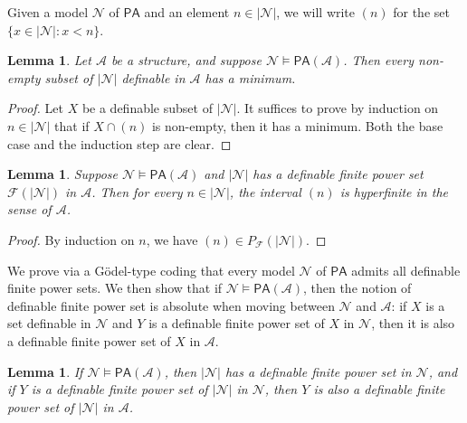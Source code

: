 \documentclass{amsart}
\newcommand{\ca}{\mathcal}
\theoremstyle{plain}
\newtheorem{lem}[thm]{Lemma}
\theoremstyle{definition}
\newcommand{\F}{\mathcal{F}}
\newcommand{\pF}{P_{\ca F}}
\newcommand{\PA}{\mathsf{PA}}
\begin{document}
Given a model $\ca N$ of $\PA$ and an element $n \in |\ca N|$, we will write $(n)$ for the set $\{x \in |\ca N| : x < n \}$.

\begin{lem}\label{lem:least number}
    Let $\ca A$ be a structure, and suppose $\ca N \models \PA(\ca A)$. Then every non-empty subset of $|\ca N|$ definable in $\ca A$ has a minimum. 
\end{lem}
\begin{proof}
Let $X$ be a definable subset of $|\ca N|$. 
It suffices to prove by induction on $n\in |\ca N|$ that if $X \cap (n)$ is non-empty, then it has a minimum. Both the base case and the induction step are clear. 
\end{proof}

\begin{lem}\label{lem:intervals-are-finite}
    Suppose $\ca N \models \PA(\ca A)$ and $|\ca N|$ has a definable finite power set $\F(|\ca N|)$ in $\ca A$. Then for every $n\in |\ca N|$, the interval $(n)$ is hyperfinite in the sense of $\ca A$. 
\end{lem}
\begin{proof}
    By induction on $n$, we have $(n)\in \pF(|\ca N|)$. 
\end{proof}

We prove via a G\"odel-type coding that every model $\ca N$ of $\PA$ admits all definable finite power sets. We then show that if $\ca N \models \PA(\ca A)$, then the notion of definable finite power set is absolute when moving between $\ca N$ and $\ca A$: if $X$ is a set definable in $\ca N$ and $Y$ is a definable finite power set of $X$ in $\ca N$, then it is also a definable finite power set of $X$ in $\ca A$.

\begin{lem}\label{lem:robust-pow-set-of-N}
If $\ca N \models \PA(\ca A)$, then $|\ca N|$ has a definable finite power set in $\ca N$, and if $Y$ is a definable finite power set of $|\ca N|$ in $\ca N$, then $Y$ is also a definable finite power set of $|\ca N|$ in $\ca A$.     
\end{lem}
\end{document}
